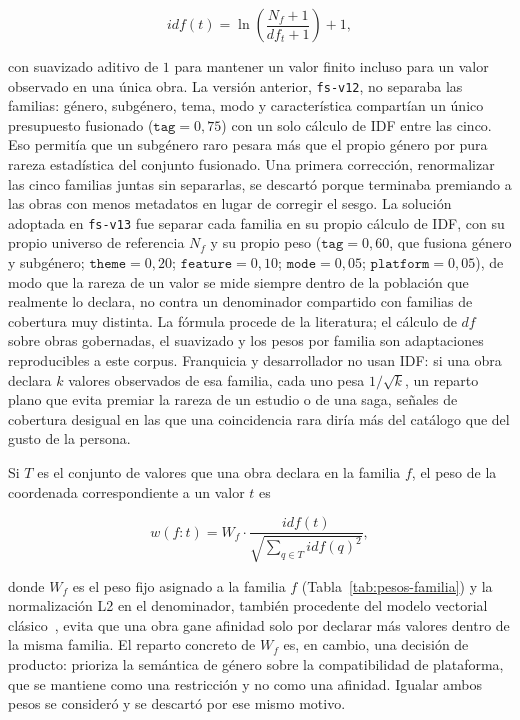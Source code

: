 \begin{equation}\label{eq:idf}
idf(t) = \ln\!\left(\frac{N_f + 1}{df_t + 1}\right) + 1 ,
\end{equation}

con suavizado aditivo de \(1\) para mantener un valor finito incluso para un valor observado
en una única obra. La versión anterior, \texttt{fs-v12}, no separaba las familias: género,
subgénero, tema, modo y característica compartían un único presupuesto fusionado
(\(\mathtt{tag}=0{,}75\)) con un solo cálculo de IDF entre las cinco. Eso permitía que un
subgénero raro pesara más que el propio género por pura rareza estadística del conjunto
fusionado. Una primera corrección, renormalizar las cinco familias juntas sin separarlas,
se descartó porque terminaba premiando a las obras con menos metadatos en lugar de corregir el
sesgo. La solución adoptada en \texttt{fs-v13} fue separar cada familia en su propio cálculo de
IDF, con su propio universo de referencia \(N_f\) y su propio peso (\(\mathtt{tag}=0{,}60\),
que fusiona género y subgénero; \(\mathtt{theme}=0{,}20\); \(\mathtt{feature}=0{,}10\);
\(\mathtt{mode}=0{,}05\); \(\mathtt{platform}=0{,}05\)), de modo que la rareza de un valor se
mide siempre dentro de la población que realmente lo declara, no contra un denominador
compartido con familias de cobertura muy distinta. La fórmula procede de la literatura; el
cálculo de \(df\) sobre obras gobernadas, el suavizado y los pesos por familia son adaptaciones
reproducibles a este corpus. Franquicia
y desarrollador no usan IDF: si una obra declara \(k\) valores observados de esa familia, cada
uno pesa \(1/\sqrt{k}\), un reparto plano que evita premiar la rareza de un estudio o de una
saga, señales de cobertura desigual en las que una coincidencia rara diría más del catálogo que
del gusto de la persona.

Si \(T\) es el conjunto de valores que una obra declara en la familia \(f\), el peso de la
coordenada correspondiente a un valor \(t\) es

\begin{equation}\label{eq:facet-weight}
w(f{:}t) = W_f \cdot \frac{idf(t)}{\sqrt{\sum_{q \in T} idf(q)^2}} ,
\end{equation}

donde \(W_f\) es el peso fijo asignado a la familia \(f\) (Tabla~\ref{tab:pesos-familia}) y la
normalización L2 en el denominador, también procedente del modelo vectorial
clásico~\cite{salton1988term}, evita que una obra gane afinidad solo por declarar más valores
dentro de la misma familia. El reparto concreto de \(W_f\) es, en cambio, una decisión de
producto: prioriza la semántica de género sobre la compatibilidad de plataforma, que se
mantiene como una restricción y no como una afinidad. Igualar ambos pesos se consideró y se
descartó por ese mismo motivo.

